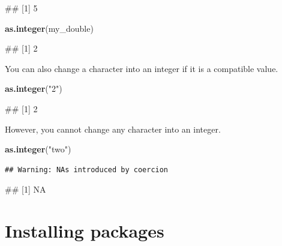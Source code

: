 \documentclass[
]{book}
\newenvironment{Shaded}{\begin{snugshade}}{\end{snugshade}}
\newcommand{\FunctionTok}[1]{\textcolor[rgb]{0.13,0.29,0.53}{\textbf{#1}}}
\newcommand{\NormalTok}[1]{#1}
\newcommand{\StringTok}[1]{\textcolor[rgb]{0.31,0.60,0.02}{#1}}
\begin{document}
\begin{Shaded}
\begin{Highlighting}[]
\NormalTok{\#\# [1] 5}
\end{Highlighting}
\end{Shaded}

\begin{Shaded}
\begin{Highlighting}[]
\FunctionTok{as.integer}\NormalTok{(my\_double)}
\end{Highlighting}
\end{Shaded}

\begin{Shaded}
\begin{Highlighting}[]
\NormalTok{\#\# [1] 2}
\end{Highlighting}
\end{Shaded}

You can also change a character into an integer if it is a compatible value.

\begin{Shaded}
\begin{Highlighting}[]
\FunctionTok{as.integer}\NormalTok{(}\StringTok{"2"}\NormalTok{)}
\end{Highlighting}
\end{Shaded}

\begin{Shaded}
\begin{Highlighting}[]
\NormalTok{\#\# [1] 2}
\end{Highlighting}
\end{Shaded}

However, you cannot change any character into an integer.

\begin{Shaded}
\begin{Highlighting}[]
\FunctionTok{as.integer}\NormalTok{(}\StringTok{"two"}\NormalTok{)}
\end{Highlighting}
\end{Shaded}

\begin{verbatim}
## Warning: NAs introduced by coercion
\end{verbatim}

\begin{Shaded}
\begin{Highlighting}[]
\NormalTok{\#\# [1] NA}
\end{Highlighting}
\end{Shaded}

\section{Installing packages}\label{installing-packages}
\end{document}
